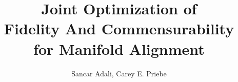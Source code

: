 \documentclass{beamer}
\title[Joint Opt. of Fidelity and Commensurability for Manif. Alignment]{ 
  Joint Optimization of \\
Fidelity And Commensurability \\
for Manifold Alignment}
\author{Sancar Adali, Carey E. Priebe}
\institute{ Department of Applied Mathematics \& Statistics \\
Johns Hopkins University}
\newcommand{\myred}{\color{red}}
\newcommand{\myblue}{\color{blue}}
\begin{document}


\begin{frame}
\titlepage
\end{frame}

%
%
%
\end{document}
